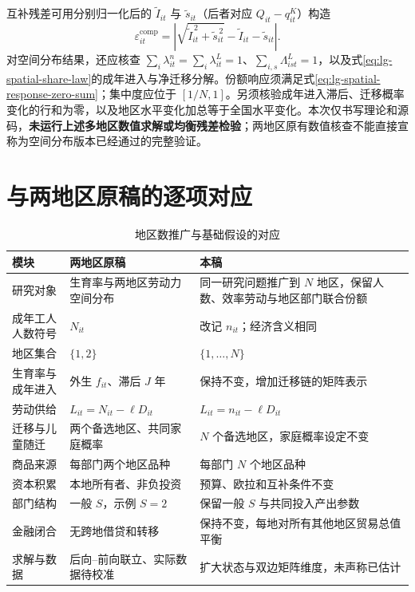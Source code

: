 \documentclass[UTF8,a4paper,zihao=-4,fontset=windows]{ctexart}
\numberwithin{equation}{section}
\newcommand{\invp}{Q}
\begin{document}
互补残差可用分别归一化后的 $\widetilde I_{it}$ 与 $\widetilde s_{it}$（后者对应 $\invp_{it}-q^K_{it}$）构造
\begin{equation}
 \varepsilon^{\mathrm{comp}}_{it}
 =\left|\sqrt{\widetilde I_{it}^{\,2}+\widetilde s_{it}^{\,2}}
 -\widetilde I_{it}-\widetilde s_{it}\right|.
\end{equation}
对空间分布结果，还应核查 $\sum_i\lambda^n_{it}=\sum_i\lambda^L_{it}=1$、$\sum_{i,s}\Lambda^L_{ist}=1$，以及式\eqref{eq:lg-spatial-share-law}的成年进入与净迁移分解。份额响应须满足式\eqref{eq:lg-spatial-response-zero-sum}；集中度应位于 $[1/N,1]$。另须核验成年进入滞后、迁移概率变化的行和为零，以及地区水平变化加总等于全国水平变化。本次仅书写理论和源码，\textbf{未运行上述多地区数值求解或均衡残差检验}；两地区原有数值核查不能直接宣称为空间分布版本已经通过的完整验证。

\appendix
\section{与两地区原稿的逐项对应}
\label{sec:lg-reduction}
\begin{table}[htbp]
\centering
\caption{地区数推广与基础假设的对应}
\begin{tabularx}{\textwidth}{p{}YY}
\toprule 模块 & 两地区原稿 & 本稿\\\midrule
研究对象 & 生育率与两地区劳动力空间分布 & 同一研究问题推广到 $N$ 地区，保留人数、效率劳动与地区部门联合份额\\
成年工人人数符号 & $N_{it}$ & 改记 $n_{it}$；经济含义相同\\
地区集合 & $\{1,2\}$ & $\{1,\ldots,N\}$\\
生育率与成年进入 & 外生 $f_{it}$、滞后 $J$ 年 & 保持不变，增加迁移链的矩阵表示\\
劳动供给 & $L_{it}=N_{it}-\ell D_{it}$ & $L_{it}=n_{it}-\ell D_{it}$\\
迁移与儿童随迁 & 两个备选地区、共同家庭概率 & $N$ 个备选地区，家庭概率设定不变\\
商品来源 & 每部门两个地区品种 & 每部门 $N$ 个地区品种\\
资本积累 & 本地所有者、非负投资 & 预算、欧拉和互补条件不变\\
部门结构 & 一般 $S$，示例 $S=2$ & 保留一般 $S$ 与共同投入产出参数\\
金融闭合 & 无跨地借贷和转移 & 保持不变，每地对所有其他地区贸易总值平衡\\
求解与数据 & 后向--前向联立、实际数据待校准 & 扩大状态与双边矩阵维度，未声称已估计\\\bottomrule
\end{tabularx}
\end{table}
\end{document}
